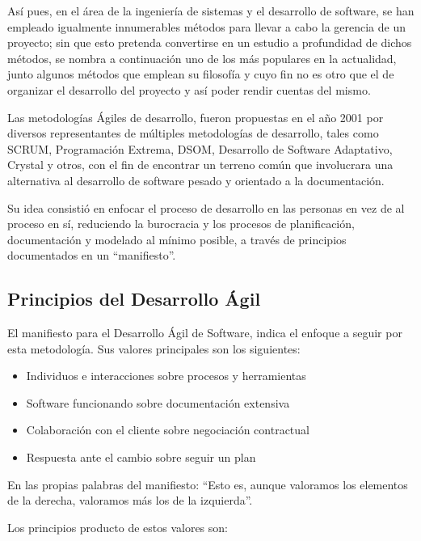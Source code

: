 Así pues, en el área de la ingeniería de sistemas y el desarrollo de software, se han empleado igualmente innumerables métodos para llevar a cabo la gerencia de un proyecto; sin que esto pretenda convertirse en un estudio a profundidad de dichos métodos, se nombra a continuación uno de los más populares en la actualidad, junto algunos métodos que emplean su filosofía y cuyo fin no es otro que el de organizar el desarrollo del proyecto y así poder rendir cuentas del mismo.

Las metodologías Ágiles de desarrollo, fueron propuestas en el año 2001 por diversos representantes de múltiples metodologías de desarrollo, tales como SCRUM, Programación Extrema, DSOM, Desarrollo de Software Adaptativo, Crystal y otros, con el fin de encontrar un terreno común que involucrara una alternativa al desarrollo de software pesado y orientado a la documentación.

Su idea consistió en enfocar el proceso de desarrollo en las personas en vez de al proceso en sí, reduciendo la burocracia y los procesos de planificación, documentación y modelado al mínimo posible, a través de principios documentados en un ``manifiesto''.

\subsection{Principios del Desarrollo Ágil}

El manifiesto para el Desarrollo Ágil de Software, indica el enfoque a seguir por esta metodología. Sus valores principales son los siguientes:

\begin{itemize}
	\itemsep1pt \parskip1pt 
	\item Individuos e interacciones sobre procesos y herramientas
	\item Software funcionando sobre documentación extensiva
	\item Colaboración con el cliente sobre negociación contractual
	\item Respuesta ante el cambio sobre seguir un plan
\end{itemize}

En las propias palabras del manifiesto: ``Esto es, aunque valoramos los elementos de la derecha, valoramos más los de la izquierda''.\cite{beck2001manifiesto}

Los principios producto de estos valores son:\cite{beck2001principios}

